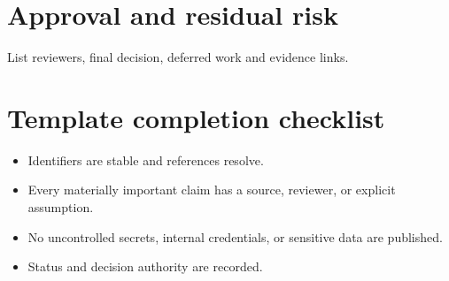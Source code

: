 \documentclass[10pt,letterpaper]{article}
\begin{document}
\section{Approval and residual risk}
List reviewers, final decision, deferred work and evidence links.

\section{Template completion checklist}
\begin{itemize}
\item Identifiers are stable and references resolve.
\item Every materially important claim has a source, reviewer, or explicit assumption.
\item No uncontrolled secrets, internal credentials, or sensitive data are published.
\item Status and decision authority are recorded.
\end{itemize}
\end{document}
